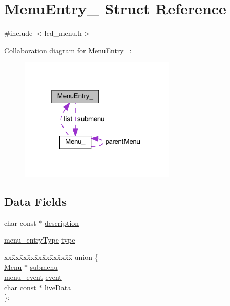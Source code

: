 \hypertarget{struct_menu_entry__}{}\section{Menu\+Entry\+\_\+ Struct Reference}
\label{struct_menu_entry__}


{\ttfamily \#include $<$lcd\+\_\+menu.\+h$>$}



Collaboration diagram for Menu\+Entry\+\_\+\+:\nopagebreak
\begin{figure}[H]
\begin{center}
\leavevmode
\includegraphics[width=211pt]{struct_menu_entry____coll__graph}
\end{center}
\end{figure}
\subsection*{Data Fields}
\begin{DoxyCompactItemize}
\item 
char const  $\ast$ \mbox{\hyperlink{struct_menu_entry___af92f126a07a2944ef81db37d6e6e21ae}{description}}
\item 
\mbox{\hyperlink{lcd__menu_8h_a8803db0b2985fc11bdaaff101b1b999d}{menu\+\_\+entry\+Type}} \mbox{\hyperlink{struct_menu_entry___a9cb8b226841d530cb28f3763c539bf19}{type}}
\item 
\begin{tabbing}
xx\=xx\=xx\=xx\=xx\=xx\=xx\=xx\=xx\=\kill
union \{\\
\>\mbox{\hyperlink{lcd__menu_8h_afe0ab1c0311f677767b1588296b0f563}{Menu}} $\ast$ \mbox{\hyperlink{struct_menu_entry___a95d149f99e4a49c9b217e31e0289c696}{submenu}}\\
\>\mbox{\hyperlink{lcd__menu_8h_af281888756940391027a7bdddf347718}{menu\_event}} \mbox{\hyperlink{struct_menu_entry___aab46a1780779046bc38a2421e1b9dd36}{event}}\\
\>char const  $\ast$ \mbox{\hyperlink{struct_menu_entry___a02edaa08d1665685fd949ffa77675ef2}{liveData}}\\
\}; \\

\end{tabbing}\end{DoxyCompactItemize}


